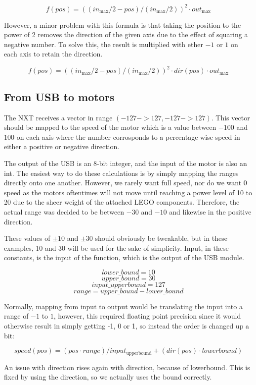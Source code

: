 $$
f(pos) = ((in_\text{max}/2 - pos)/(in_\text{max}/2))^2 \cdot out_\text{max}
$$

However, a minor problem with this formula is that taking the position to the power of 2 removes the direction of the given axis due to the effect of squaring a negative number.
To solve this, the result is multiplied with ether $-1$ or $1$ on each axis to retain the direction.

$$
f(pos) = ((in_\text{max}/2 - pos)/(in_\text{max}/2))^2 \cdot dir(pos) \cdot out_\text{max}
$$

\subsection{From USB to motors}
The NXT receives a vector in range $(-127 -> 127, -127 -> 127)$.
This vector should be mapped to the speed of the motor which is a value between $-100$ and $100$ on each axis where the number corrosponds to a percentage-wise speed in either a positive or negative direction.

The output of the USB is an 8-bit integer, and the input of the motor is also an int.
The easiest way to do these calculations is by simply mapping the ranges directly onto one another.
However, we rarely want full speed, nor do we want 0 speed as the motors oftentimes will not move until reaching a power level of 10 to 20 due to the sheer weight of the attached LEGO components.
Therefore, the actual range was decided to be between $-30$ and $-10$ and likewise in the positive direction.

These values of $\pm10$ and $\pm30$ should obviously be tweakable, but in these examples, 10 and 30 will be used for the sake of simplicity. 
Input, in these constants, is the input of the function, which is the output of the USB module.

	$$lower\_bound = 10$$
	$$upper\_bound = 30$$
	$$input\_upperbound = 127$$
	$$range = upper\_bound - lower\_bound$$

Normally, mapping from input to output would be translating the input into a range of $-1$ to $1$, however, this required floating point precision since it would otherwise result in simply getting -1, 0 or 1, so instead the order is changed up a bit:

$$
speed(pos) = (pos \cdot range)/input_\text{upperbound} + (dir(pos) \cdot lowerbound)
$$

An issue with direction rises again with direction, because of lowerbound.
This is fixed by using the direction, so we actually uses the bound correctly.
